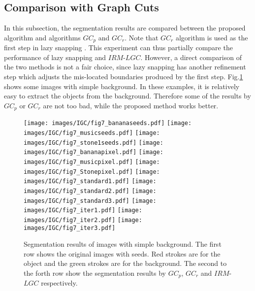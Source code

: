 \subsection{Comparison with Graph Cuts} \label{IGC:sec:experiment1}
In this subsection, the segmentation results are compared between the proposed algorithm and algorithms $GC_p$ and $GC_r$. Note that $GC_r$ algorithm is used as the first step in lazy snapping \cite{lazy}. This experiment can thus partially compare the performance of lazy snapping and $IRM$-$LGC$. However, a direct comparison of the two methods is not a fair choice, since lazy snapping has another refinement step which adjusts the mis-located boundaries produced by the first step. Fig.\ref{IGC:fig:segment1} shows some images with simple background. In these examples, it is relatively easy to extract the objects from the background. Therefore some of the results by $GC_p$ or $GC_r$ are not too bad, while the proposed method works better.
 \begin{figure}[htp]
        \centering
        {{\label{fig:7:grad1}\texttt{[image: images/IGC/fig7\_bananaseeds.pdf]}}
        {\label{fig:7:water1}\texttt{[image: images/IGC/fig7\_musicseeds.pdf]}}
        {\label{fig:7:grad2}\texttt{[image: images/IGC/fig7\_stone1seeds.pdf]}}
        {\label{fig:7:water2}\texttt{[image: images/IGC/fig7\_bananapixel.pdf]}}
        {\label{fig:7:water2}\texttt{[image: images/IGC/fig7\_musicpixel.pdf]}}
        {\label{fig:7:water2}\texttt{[image: images/IGC/fig7\_Stonepixel.pdf]}}
        {\label{fig:7:seeds}\texttt{[image: images/IGC/fig7\_standard1.pdf]}}
        {\label{fig:7:water2}\texttt{[image: images/IGC/fig7\_standard2.pdf]}}
        {\label{fig:7:water2}\texttt{[image: images/IGC/fig7\_standard3.pdf]}}
        {\label{fig:7:water2}\texttt{[image: images/IGC/fig7\_iter1.pdf]}}
        {\label{fig:7:water2}\texttt{[image: images/IGC/fig7\_iter2.pdf]}}
        {\label{fig:7:water2}\texttt{[image: images/IGC/fig7\_iter3.pdf]}}
        }
        \caption{Segmentation results of images with simple background. The first
        row shows the original images with seeds. Red strokes are for the object
        and the green strokes are for the background.  The second to the forth
        row show the segmentation results by $GC_p$, $GC_r$ and $IRM$-$LGC$ respectively.}
        \label{IGC:fig:segment1}
        \end{figure}

